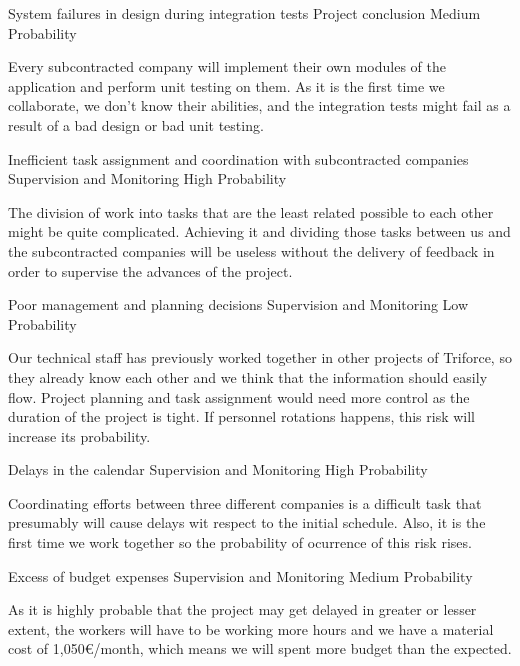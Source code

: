 \begin{risk}[riskIntegrationTests]{System failures in design during integration tests}
\riskcat Project conclusion
 Medium Probability

Every subcontracted company will implement their own modules of the application and perform unit testing on them. As it is the first time we collaborate, we don't know their abilities, and the integration tests might fail as a result of a bad design or bad unit testing.
\end{risk}

\begin{risk}[riskAssignment]{Inefficient task assignment and coordination with subcontracted companies}
\riskcat Supervision and Monitoring
 High Probability

The division of work into tasks that are the least related possible to each other might be quite complicated. Achieving it and dividing those tasks between us and the subcontracted companies will be useless without the delivery of feedback in order to supervise the advances of the project.
\end{risk}

\begin{risk}[riskManagement]{Poor management and planning decisions}
\riskcat Supervision and Monitoring
 Low Probability

Our technical staff has previously worked together in other projects of Triforce, so they already know each other and we think that the information should easily flow. Project planning and task assignment would need more control as the duration of the project is tight. If personnel rotations happens, this risk will increase its probability.
\end{risk}

\begin{risk}[riskDelays]{Delays in the calendar}
\riskcat Supervision and Monitoring
 High Probability

Coordinating efforts between three different companies is a difficult task that presumably will cause delays wit respect to the initial schedule. Also, it is the first time we work together so the probability of ocurrence of this risk rises.
\end{risk}

\begin{risk}[riskBudget]{Excess of budget expenses}
\riskcat Supervision and Monitoring
 Medium Probability

As it is highly probable that the project may get delayed in greater or lesser extent, the workers will have to be working more hours and we have a material cost of 1,050\euro/month, which means we will spent more budget than the expected.
\end{risk}

